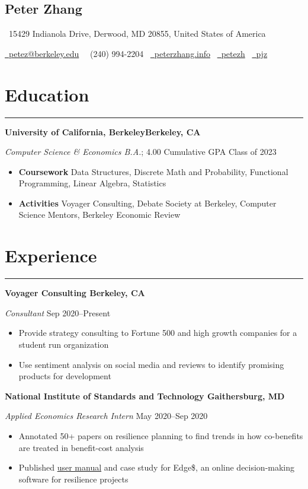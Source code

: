 \documentclass[11pt]{article}
\newcommand{\name}[1]{\begin{center}\section*{\huge \color{highlight} #1}\end{center}}
\newcommand{\topinfo}[1]{\begin{center}\vspace{-0.2cm}#1\vspace{-0.2cm}\end{center}}
\newcommand{\resumesection}[1]{\vspace{-0.3cm}\section*{\color{highlight}#1}\vspace{-0.3cm}\hrule\vspace{0.3cm}}
\begin{document}
\name{Peter Zhang}
\topinfo{\faHome \ 15429 Indianola Drive, Derwood, MD 20855, United States of America}
\topinfo{\href{mailto:petez@berkeley.edu}{\faEnvelope \ petez@berkeley.edu} \ \faPhone \ (240) 994-2204 \ \href{https://peterzhang.info/}{\faBriefcase \ peterzhang.info} \  \href{https://github.com/petezh}{\faGithub \ petezh} \  \href{https://www.linkedin.com/in/pjz/}{\faLinkedinSquare \ pjz}}

\resumesection{Education}

\textbf{University of California, Berkeley\hfill Berkeley, CA} \par
\textit{Computer Science \& Economics B.A.}; 4.00 Cumulative GPA \hfill Class of 2023
\begin{itemize}
	\item \textbf{Coursework} Data Structures, Discrete Math and Probability, Functional Programming, Linear Algebra, Statistics
	\item \textbf{Activities} Voyager Consulting, Debate Society at Berkeley, Computer Science Mentors, Berkeley Economic Review
\end{itemize}

\resumesection{Experience}

\textbf{Voyager Consulting \hfill Berkeley, CA}\par
\textit{Consultant} \hfill Sep 2020--Present
\begin{itemize}
	\item Provide strategy consulting to Fortune 500 and high growth companies for a student run organization
	\item Use sentiment analysis on social media and reviews to identify promising products for development
\end{itemize}\par


\textbf{National Institute of Standards and Technology \hfill Gaithersburg, MD}\par

\textit{Applied Economics Research Intern} \hfill May 2020--Sep 2020
\begin{itemize}
	\item Annotated 50+ papers on resilience planning to find trends in how co-benefits are treated in benefit-cost analysis
	\item Published \href{https://nvlpubs.nist.gov/nistpubs/SpecialPublications/NIST.SP.1260.pdf}{user manual} and case study for Edge\$, an online decision-making software for resilience projects
\end{itemize}\par
\end{document}
